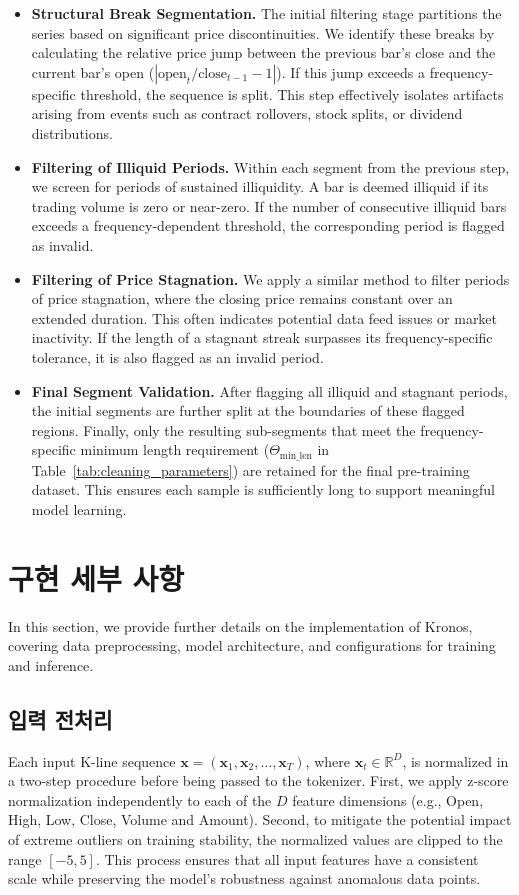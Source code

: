 \begin{itemize}
    \item \textbf{Structural Break Segmentation.} The initial filtering stage partitions the series based on significant price discontinuities. We identify these breaks by calculating the relative price jump between the previous bar's close and the current bar's open ($| \text{open}_t / \text{close}_{t-1} - 1 |$). If this jump exceeds a frequency-specific threshold, the sequence is split. This step effectively isolates artifacts arising from events such as contract rollovers, stock splits, or dividend distributions.
    \item \textbf{Filtering of Illiquid Periods.} Within each segment from the previous step, we screen for periods of sustained illiquidity. A bar is deemed illiquid if its trading volume is zero or near-zero. If the number of consecutive illiquid bars exceeds a frequency-dependent threshold, the corresponding period is flagged as invalid.
    \item \textbf{Filtering of Price Stagnation.} We apply a similar method to filter periods of price stagnation, where the closing price remains constant over an extended duration. This often indicates potential data feed issues or market inactivity. If the length of a stagnant streak surpasses its frequency-specific tolerance, it is also flagged as an invalid period.
    \item \textbf{Final Segment Validation.} After flagging all illiquid and stagnant periods, the initial segments are further split at the boundaries of these flagged regions. Finally, only the resulting sub-segments that meet the frequency-specific minimum length requirement ($\Theta_{\text{min\_len}}$ in Table~\ref{tab:cleaning_parameters}) are retained for the final pre-training dataset. This ensures each sample is sufficiently long to support meaningful model learning.
\end{itemize}

\section{구현 세부 사항}
\label{sec:implementation_details}

In this section, we provide further details on the implementation of Kronos, covering data preprocessing, model architecture, and configurations for training and inference.

\subsection{입력 전처리}
\label{sec:input_processing}
Each input K-line sequence $\mathbf{x} = (\mathbf{x}_1, \mathbf{x}_2, \dots, \mathbf{x}_T)$, where $\mathbf{x}_t \in \mathbb{R}^D$, is normalized in a two-step procedure before being passed to the tokenizer. First, we apply z-score normalization independently to each of the $D$ feature dimensions (e.g., Open, High, Low, Close, Volume and Amount). Second, to mitigate the potential impact of extreme outliers on training stability, the normalized values are clipped to the range $[-5, 5]$. This process ensures that all input features have a consistent scale while preserving the model's robustness against anomalous data points.

